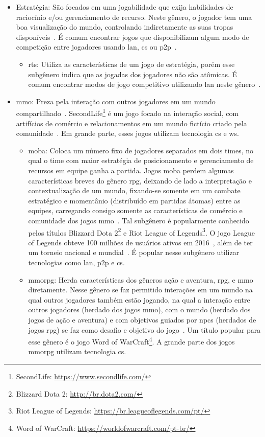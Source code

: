 \begin{itemize}
  \item Estratégia: São focados em uma jogabilidade que exija habilidades de raciocínio e/ou gerenciamento de recurso. Neste gênero, o jogador tem uma boa visualização do mundo, controlando indiretamente as suas tropas disponíveis~\cite{rollings2003andrew}. É comum encontrar jogos que disponibilizam algum modo de competição entre jogadores usando \ac{lan}, \ac{cs} ou \ac{p2p}~\cite{adams_1208533}.
    \begin{itemize}
      \item \ac{rts}: Utiliza as características de um jogo de estratégia, porém esse subgênero indica que as jogadas dos jogadores não são atômicas. É comum encontrar modos de jogo competitivo utilizando \ac{lan} neste gênero~\cite{adams_1208533}.
    \end{itemize}
  \item \ac{mmo}: Preza pela interação com outros jogadores em um mundo compartilhado~\cite{adams_1208533}. SecondLife\footnote{SecondLife: \url{https://www.secondlife.com/}} é um jogo focado na interação social, com artifícios de comércio e relacionamentos em um mundo fictício criado pela comunidade~\cite{tecmundo_secondlife}. Em grande parte, esses jogos utilizam tecnologia \ac{cs} e \ac{ws}.
    \begin{itemize}
      \item \ac{moba}: Coloca um número fixo de jogadores separados em dois times, no qual o time com maior estratégia de posicionamento e gerenciamento de recursos em equipe ganha a partida. Jogos \ac{moba} perdem algumas características breves do gênero \ac{rpg}, deixando de lado a interpretação e contextualização de um mundo, fixando-se somente em um combate estratégico e momentânio (distribuído em partidas átomas) entre as equipes, carregando consigo somente as características de comércio e comunidade dos jogos \ac{mmo}~\cite{adams_1208533}. Tal subgênero é popularmente conhecido pelos títulos Blizzard Dota 2\footnote{Blizzard Dota 2: \url{http://br.dota2.com/}} e Riot League of Legends\footnote{Riot League of Legends: \url{https://br.leagueoflegends.com/pt/}}. O jogo League of Legends obteve 100 milhões de usuários ativos em 2016~\cite{lol_statista}, além de ter um torneio nacional e mundial~\cite{lol_sportv}. É popular nesse subgênero utilizar tecnologias como \ac{lan}, \ac{p2p} e \ac{cs}.
      \item \ac{mmorpg}: Herda características dos gêneros ação e aventura, \ac{rpg}, e \ac{mmo} diretamente. Nesse gênero se faz permitido interações em um mundo na qual outros jogadores também estão jogando, na qual a interação entre outros jogadores (herdado dos jogos \ac{mmo}), com o mundo (herdado dos jogos de ação e aventura) e com objetivos guiados por \ac{npcs} (herdados de jogos \ac{rpg}) se faz como desafio e objetivo do jogo~\cite{adams_1208533}. Um título popular para esse gênero é o jogo Word of WarCraft\footnote{Word of WarCraft: \url{https://worldofwarcraft.com/pt-br/}}. A grande parte dos jogos \ac{mmorpg} utilizam tecnologia \ac{cs}.

\end{itemize}
\end{itemize}
